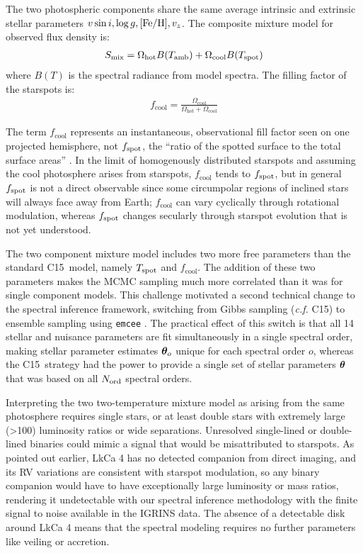 \documentclass[twocolumn]{emulateapj}%
\newcommand{\iancze}{{\sc C15}}
\begin{document}
The two photospheric components share the same average intrinsic and extrinsic stellar parameters $v \sin i, \log g, [{\rm Fe}/{\rm H}], v_z$.  The composite mixture model for observed flux density is:
\begin{eqnarray} \label{eqn:mix_M}
S_{\mathrm{mix}} = \Omega_{\mathrm{hot}} B(T_\textrm{amb})  + \Omega_{\mathrm{cool}} B(T_\textrm{spot})
\end{eqnarray}
where $B(T)$ is the spectral radiance from model spectra.  The filling factor of the starspots is:
\begin{eqnarray} \label{eqn:fill_factor}
f_{\mathrm{cool}} = \frac{\Omega_{\mathrm{cool}}}{\Omega_{\mathrm{hot}} + \Omega_{\mathrm{cool}}}
\end{eqnarray}

The term $f_{\mathrm{cool}}$ represents an instantaneous, observational fill factor seen on one projected hemisphere, not $f_{\rm spot}$, the ``ratio of the spotted surface to the total surface areas'' \citep{somers15}.  In the limit of homogenously distributed starspots and assuming the cool photosphere arises from starspots, $f_{\mathrm{cool}}$ tends to $f_{\rm spot}$, but in general $f_{\rm spot}$ is not a direct observable since some circumpolar regions of inclined stars will always face away from Earth; $f_{\mathrm{cool}}$ can vary cyclically through rotational modulation, whereas $f_{\rm spot}$ changes secularly through starspot evolution that is not yet understood.

The two component mixture model includes two more free parameters than the standard \iancze\ model, namely $T_\textrm{spot}$ and $f_{\mathrm{cool}}$.  The addition of these two parameters makes the MCMC sampling much more correlated than it was for single component models.  This challenge motivated a second technical change to the spectral inference framework, switching from Gibbs sampling (\emph{c.f.} \iancze) to ensemble sampling using \texttt{emcee} \citep{foreman13}.  The practical effect of this switch is that all 14 stellar and nuisance parameters are fit simultaneously in a single spectral order, making stellar parameter estimates ${\bm \theta}_{o}$ unique for each spectral order $o$, whereas the \iancze\ strategy had the power to provide a single set of stellar parameters ${\bm \theta}$ that was based on all $N_{\rm ord}$ spectral orders.

Interpreting the two two-temperature mixture model as arising from the same photosphere requires single stars, or at least double stars with extremely large (>100) luminosity ratios or wide separations.  Unresolved single-lined or double-lined binaries could mimic a signal that would be misattributed to starspots.  As pointed out earlier, LkCa 4 has no detected companion from direct imaging, and its RV variations are consistent with starspot modulation, so any binary companion would have to have exceptionally large luminosity or mass ratios, rendering it undetectable with our spectral inference methodology with the finite signal to noise available in the IGRINS data.  The absence of a detectable disk around LkCa 4 means that the spectral modeling requires no further parameters like veiling or accretion.
\end{document}
